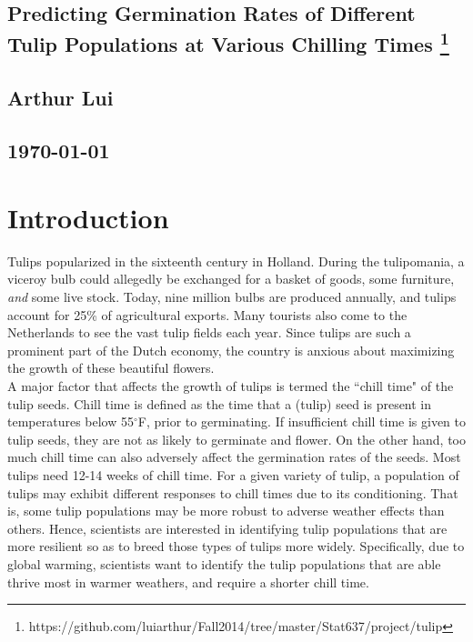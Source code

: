 \documentclass[mathserif]{article}
\begin{document}
\begin{center}
  \section*{\textbf{Predicting Germination Rates of Different Tulip
                    Populations at Various Chilling Times}
    \footnote{https://github.com/luiarthur/Fall2014/tree/master/Stat637/project/tulip}
  }
  \subsection*{\textbf{Arthur Lui}}
  \subsection*{\noindent\today}
\end{center}

\section*{Introduction}
Tulips popularized in the sixteenth century in Holland. During the tulipomania,
a viceroy bulb could allegedly be exchanged for a basket of goods, some
furniture, \textit{and} some live stock. Today, nine million bulbs are produced
annually, and tulips account for 25\% of agricultural exports. Many tourists
also come to the Netherlands to see the vast tulip fields each year. Since
tulips are such a prominent part of the Dutch economy, the country is anxious
about maximizing the growth of these beautiful flowers.\\

\noindent
A major factor that affects the growth of tulips is termed the ``chill time" of
the tulip seeds. Chill time is defined as the time that a (tulip) seed is
present in temperatures below 55$^\circ$F, prior to germinating. If
insufficient chill time is given to tulip seeds, they are not as likely to
germinate and flower. On the other hand, too much chill time can also adversely
affect the germination rates of the seeds.  Most tulips need 12-14 weeks of
chill time. For a given variety of tulip, a population of tulips may exhibit different
responses to chill times due to its conditioning. That is, some tulip populations
may be more robust to adverse weather effects than others. Hence, scientists are
interested in identifying tulip populations that are more resilient so as to 
breed those types of tulips more widely. Specifically, due to global warming, 
scientists want to identify the tulip populations that are able thrive most
in warmer weathers, and require a shorter chill time.\\
\end{document}
